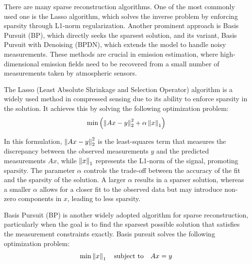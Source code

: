 There are many sparse reconstruction algorithms.
One of the most commonly used one is the Lasso algorithm, which solves the inverse problem by enforcing sparsity through L1-norm regularization.
Another prominent approach is Basis Pursuit (BP), which directly seeks the sparsest solution, and its variant, Basis Pursuit with Denoising (BPDN), which extends the model to handle noisy measurements.
These methods are crucial in emission estimation, where high-dimensional emission fields need to be recovered from a small number of measurements taken by atmospheric sensors.

The Lasso (Least Absolute Shrinkage and Selection Operator) algorithm is a widely used method in compressed sensing due to its ability to enforce sparsity in the solution.
It achieves this by solving the following optimization problem:
\begin{equation}
    \min{\left( \left\lVert Ax -y \right\rVert_2^2 + \alpha\left\lVert x\right\rVert_1 \right)}
\end{equation}

In this formulation, $\left\lVert Ax -y \right\rVert_2^2$ is the least-squares term that measures the discrepancy between the observed measurements $y$ and the predicted measurements $Ax$, while $\left\lVert x\right\rVert_1$ represents the L1-norm of the signal, promoting sparsity.
The parameter $\alpha$ controls the trade-off between the accuracy of the fit and the sparsity of the solution.
A larger $\alpha$ results in a sparser solution, whereas a smaller $\alpha$ allows for a closer fit to the observed data but may introduce non-zero components in $x$, leading to less sparsity.


Basis Pursuit (BP) is another widely adopted algorithm for sparse reconstruction, particularly when the goal is to find the sparsest possible solution that satisfies the measurement constraints exactly.
Basis pursuit solves the following optimization problem:
\begin{equation}
    \min \left\lVert x\right\rVert_1 \quad \text{subject to} \quad  Ax = y
\end{equation}


